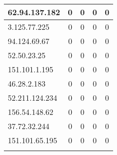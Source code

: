\documentclass{article}
\begin{document}
\begin{longtable}{|>{\raggedright\arraybackslash}p{3cm}|c|c|c|c|}
    
    \rowcolor{lightgreen} %
    
    62.94.137.182 & 0 & 0 & 0 & 0 \\
    \hline
    
    
    \rowcolor{lightgreen} %
    
    3.125.77.225 & 0 & 0 & 0 & 0 \\
    \hline
    
    
    \rowcolor{lightgreen} %
    
    94.124.69.67 & 0 & 0 & 0 & 0 \\
    \hline
    
    
    \rowcolor{lightgreen} %
    
    52.50.23.25 & 0 & 0 & 0 & 0 \\
    \hline
    
    
    \rowcolor{lightgreen} %
    
    151.101.1.195 & 0 & 0 & 0 & 0 \\
    \hline
    
    
    \rowcolor{lightgreen} %
    
    46.28.2.183 & 0 & 0 & 0 & 0 \\
    \hline
    
    
    \rowcolor{lightgreen} %
    
    52.211.124.234 & 0 & 0 & 0 & 0 \\
    \hline
    
    
    \rowcolor{lightgreen} %
    
    156.54.148.62 & 0 & 0 & 0 & 0 \\
    \hline
    
    
    \rowcolor{lightgreen} %
    
    37.72.32.244 & 0 & 0 & 0 & 0 \\
    \hline
    
    
    \rowcolor{lightgreen} %
    
    151.101.65.195 & 0 & 0 & 0 & 0 \\
    \hline
    
    
    \rowcolor{lightgreen} %
    

\end{longtable}
\end{document}
